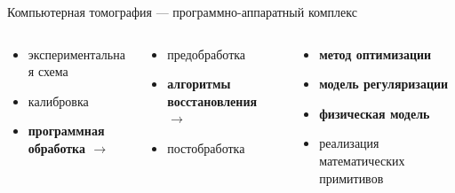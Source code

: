 \documentclass[12pt]{beamer}
\begin{document}
\begingroup

\begin{frame}
Компьютерная томография --- программно-аппаратный комплекс
\setlength{\leftmargini}{0em}
\begin{columns}[T,onlytextwidth]
  \begin{column}{.4\textwidth}
  \begin{itemize}
    \item экспериментальная схема
    \item калибровка 
    \item \textbf{программная обработка $\rightarrow$}
  \end{itemize}
  \end{column}
  \pause
  \begin{column}[t]{0.4\linewidth}
  \begin{itemize}
    \item предобработка
    \item \textbf{алгоритмы восстановления $\rightarrow$}
    \item постобработка
  \end{itemize}
  \end{column}
  \pause
  \begin{column}[t]{0.35\linewidth}
  \begin{itemize}
    \item \textbf{метод оптимизации}
    \item \textbf{модель регуляризации}
    \item \textbf{физическая модель}
    \item реализация математических примитивов
  \end{itemize}
  \end{column}
\end{columns}
\end{frame}
\endgroup

\end{document}
